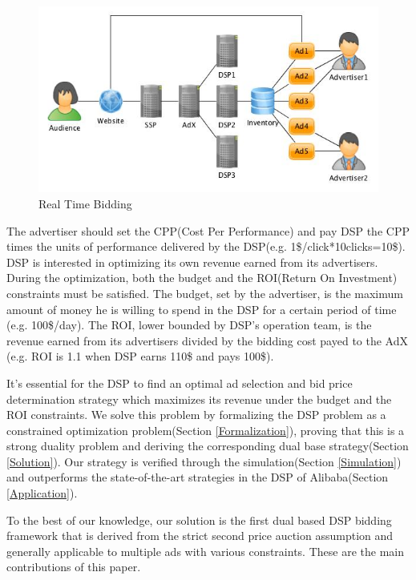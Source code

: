 \documentclass{article}
\begin{document}
\begin{figure}[!h]
\centering
\includegraphics[width=1.0\linewidth]{./DSP.jpg}
\caption{Real Time Bidding}
\end{figure}

The advertiser should set the CPP(Cost Per Performance) and
    pay DSP the CPP times the units of performance delivered by the DSP(e.g. 1\$/click*10clicks=10\$).
DSP is interested in optimizing its own revenue earned from its advertisers.
During the optimization, both the budget and the ROI(Return On Investment) constraints must be satisfied.
The budget, set by the advertiser, is the maximum amount of money he is willing to spend in the DSP for a certain period of time (e.g. 100\$/day).
The ROI, lower bounded by DSP's operation team, is the revenue earned from its advertisers divided by the bidding cost payed to the AdX
    (e.g. ROI is 1.1 when DSP earns 110\$ and pays 100\$).

It's essential for the DSP to find an optimal ad selection and bid price determination strategy
    which maximizes its revenue under the budget and the ROI constraints.
We solve this problem by
    formalizing the DSP problem as a constrained optimization problem(Section \ref{Formalization}),
    proving that this is a strong duality problem and deriving the corresponding dual base strategy(Section \ref{Solution}).
Our strategy is verified through the simulation(Section \ref{Simulation}) and
    outperforms the state-of-the-art strategies in the DSP of Alibaba(Section \ref{Application}).

To the best of our knowledge, our solution is the first dual based DSP bidding framework
    that is derived from the strict second price auction assumption and
    generally applicable to multiple ads with various constraints.
These are the main contributions of this paper.
\end{document}
